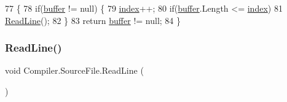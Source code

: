 \begin{DoxyCode}
77                                            \{
78                         \textcolor{keywordflow}{if}(\mbox{\hyperlink{class_compiler_1_1_source_file_a6ac27509abd78029bf3881636983ab48}{buffer}} != null) \{
79                             \mbox{\hyperlink{class_compiler_1_1_source_file_a46a2996b918f0b2f795449879663cfe5}{index}}++;
80                             \textcolor{keywordflow}{if}(\mbox{\hyperlink{class_compiler_1_1_source_file_a6ac27509abd78029bf3881636983ab48}{buffer}}.Length <= \mbox{\hyperlink{class_compiler_1_1_source_file_a46a2996b918f0b2f795449879663cfe5}{index}})
81                                 \mbox{\hyperlink{class_compiler_1_1_source_file_a4e9f67bce62e15431b753705a79097ad}{ReadLine}}();
82                         \}
83                         \textcolor{keywordflow}{return} \mbox{\hyperlink{class_compiler_1_1_source_file_a6ac27509abd78029bf3881636983ab48}{buffer}} != null;
84                     \}
\end{DoxyCode}
\mbox{\label{class_compiler_1_1_source_file_a4e9f67bce62e15431b753705a79097ad}} 
\subsubsection{\texorpdfstring{Read\+Line()}{ReadLine()}}
{\footnotesize\ttfamily void Compiler.\+Source\+File.\+Read\+Line (\begin{DoxyParamCaption}{ }\end{DoxyParamCaption})\hspace{0.3cm}{\ttfamily [private]}}

